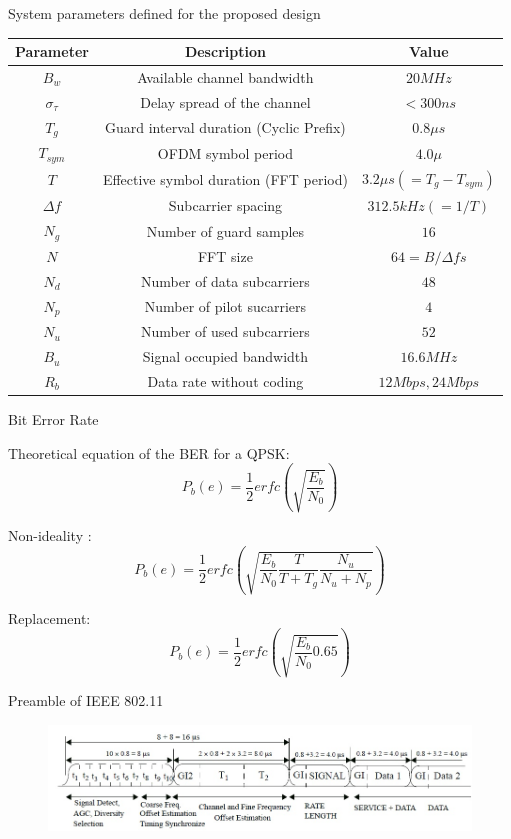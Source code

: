 \documentclass{beamer}
\begin{document}
\begin{frame}{System parameters defined for the proposed design}
\begin{table}
\begin{tabular}{c|c|c}
Parameter&Description&Value\\ \hline
$B_{w}$&Available channel bandwidth&$20MHz$\\
$\sigma_{\tau}$&Delay spread of the channel& $<300 ns$\\
$T_{g}$&Guard interval duration (Cyclic Prefix)&$0.8\mu s$\\
$T_{sym}$&OFDM symbol period&$4.0\mu$\\
$T$&Effective symbol duration (FFT period)&$3.2\mu s (=T_{g}- T_{sym})$\\
$\Delta f$&Subcarrier spacing&$312.5kHz (=1/T)$\\
$N_{g}$&Number of guard samples&$16$\\
$N$&FFT size&$64= B/\Delta f s$\\
$N_{d}$&Number of data subcarriers&$48$\\
$N_{p}$&Number of pilot sucarriers&$4$\\
$N_{u}$&Number of used subcarriers&$52$\\
$B_{u}$&Signal occupied bandwidth&$16.6MHz$\\
$R_{b}$&Data rate without coding&$12Mbps, 24Mbps$\\
\end{tabular}
\end{table}
\end{frame}

\begin{frame}{Bit Error Rate}

Theoretical equation of the BER for a QPSK:
\begin{equation}
P_{b}(e)= \dfrac{1}{2}erfc(\sqrt{\dfrac{E_{b}}{N_{0}}})
\end{equation}

Non-ideality :
\begin{equation}
P_{b}(e)= \dfrac{1}{2}erfc(\sqrt{\dfrac{E_{b}}{N_{0}}\dfrac{T}{T+T_{g}}\dfrac{N_{u}}{N_{u}+N_{p}}})
\end{equation}

Replacement:
\begin{equation}
P_{b}(e)= \dfrac{1}{2}erfc(\sqrt{\dfrac{E_{b}}{N_{0}}0.65})
\end{equation}


\end{frame}

\begin{frame}{Preamble of IEEE 802.11}

\begin{figure}[h!]
\centering
\includegraphics[width=\textwidth]{content/fig/ofdm_frame.JPG}
\end{figure}
\end{frame}
\end{document}

